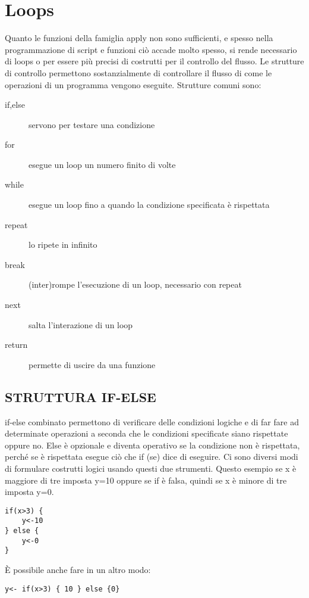 \chapter{Loops}
Quanto le funzioni della famiglia \textsf{apply} non sono sufficienti, e spesso nella programmazione di script e funzioni ciò accade molto spesso, si rende necessario di loops o per essere più precisi di costrutti per il controllo del flusso.
Le strutture di controllo permettono sostanzialmente di controllare il flusso di come le operazioni di un programma vengono eseguite. Strutture comuni sono:

\begin{description}
\item[if,else] servono per testare una condizione \\
\item[for] esegue un loop un numero finito di volte \\
\item[while] esegue un loop fino a quando la condizione specificata è rispettata \\
\item[repeat] lo ripete in infinito \\
\item[break] (inter)rompe l'esecuzione di un loop, necessario con repeat \\
\item[next] salta l'interazione di un loop \\
\item[return] permette di uscire da una funzione \\
\end{description}

\section{STRUTTURA IF-ELSE}

if-else combinato permettono di verificare delle condizioni logiche e di far fare ad \erre determinate operazioni a seconda che le condizioni specificate siano rispettate oppure no. Else è opzionale e diventa operativo se la condizione non è rispettata, perché se è rispettata esegue ciò che if (se) dice di eseguire.
Ci sono diversi modi di formulare costrutti logici usando questi due strumenti.
Questo esempio se x è maggiore di tre \erre imposta y=10 oppure se if è falsa,
quindi se x è minore di tre \erre imposta y=0.
\begin{lstlisting}
if(x>3) {
	y<-10
} else {
	y<-0
}
\end{lstlisting}
È possibile anche fare in un altro modo:
\begin{lstlisting}
y<- if(x>3) { 10 } else {0}
\end{lstlisting}

